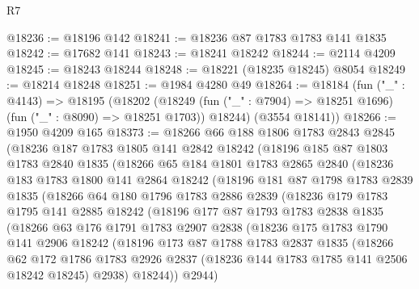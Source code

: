 \begin{lexlean}{R7}
\begin{coremodule}
@18236 := @18196 @142
@18241 := @18236 @87 @1783 @1783 @141 @1835
@18242 := @17682 @141
@18243 := @18241 @18242
@18244 := @2114 @4209
@18245 := @18243 @18244
@18248 := @18221 (@18235 @18245) @8054
@18249 := @18214 @18248
@18251 := @1984 @4280 @49
@18264 := @18184
    (fun ("_" : @4143) =>
    @18195
      (@18202
        (@18249 (fun ("_" : @7904) => @18251 @1696) (fun ("_" : @8090) => @18251 @1703))
        @18244)
      (@3554 @18141))
@18266 := @1950 @4209 @165
@18373 := @18266
    @66
    @188
    @1806
    @1783
    @2843
    @2845
    (@18236
      @187
      @1783
      @1805
      @141
      @2842
      @18242
      (@18196
        @185
        @87
        @1803
        @1783
        @2840
        @1835
        (@18266
          @65
          @184
          @1801
          @1783
          @2865
          @2840
          (@18236
            @183
            @1783
            @1800
            @141
            @2864
            @18242
            (@18196
              @181
              @87
              @1798
              @1783
              @2839
              @1835
              (@18266
                @64
                @180
                @1796
                @1783
                @2886
                @2839
                (@18236
                  @179
                  @1783
                  @1795
                  @141
                  @2885
                  @18242
                  (@18196
                    @177
                    @87
                    @1793
                    @1783
                    @2838
                    @1835
                    (@18266
                      @63
                      @176
                      @1791
                      @1783
                      @2907
                      @2838
                      (@18236
                        @175
                        @1783
                        @1790
                        @141
                        @2906
                        @18242
                        (@18196
                          @173
                          @87
                          @1788
                          @1783
                          @2837
                          @1835
                          (@18266
                            @62
                            @172
                            @1786
                            @1783
                            @2926
                            @2837
                            (@18236 @144 @1783 @1785 @141 @2506 @18242 @18245)
                            @2938)
                          @18244))
                      @2944)

\end{coremodule}
\end{lexlean}
